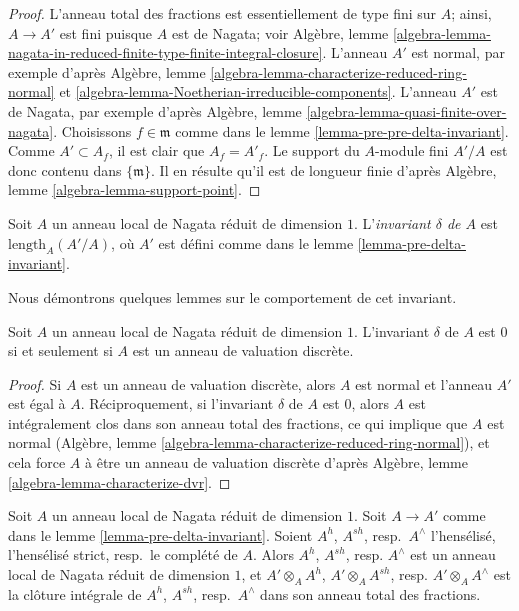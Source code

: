 \begin{proof}
L'anneau total des fractions est essentiellement de type fini sur $A$;
ainsi, $A \to A'$ est fini puisque $A$ est de Nagata; voir Algèbre, lemme
\ref{algebra-lemma-nagata-in-reduced-finite-type-finite-integral-closure}.
L'anneau $A'$ est normal, par exemple d'après
Algèbre, lemme \ref{algebra-lemma-characterize-reduced-ring-normal} et
\ref{algebra-lemma-Noetherian-irreducible-components}.
L'anneau $A'$ est de Nagata, par exemple d'après
Algèbre, lemme \ref{algebra-lemma-quasi-finite-over-nagata}.
Choisissons $f \in \mathfrak m$ comme dans le lemme \ref{lemma-pre-pre-delta-invariant}.
Comme $A' \subset A_f$, il est clair que $A_f = A'_f$. Le support du
$A$-module fini $A'/A$ est donc contenu dans $\{\mathfrak m\}$.
Il en résulte qu'il est de longueur finie d'après
Algèbre, lemme \ref{algebra-lemma-support-point}.
\end{proof}

\begin{definition}
\label{definition-delta-invariant-algebra}
Soit $A$ un anneau local de Nagata réduit de dimension $1$.
L'{\it invariant $\delta$ de $A$} est $\text{length}_A(A'/A)$,
où $A'$ est défini comme dans le lemme \ref{lemma-pre-delta-invariant}.
\end{definition}

\noindent
Nous démontrons quelques lemmes sur le comportement de cet invariant.

\begin{lemma}
\label{lemma-delta-invariant-is-zero}
Soit $A$ un anneau local de Nagata réduit de dimension $1$.
L'invariant $\delta$ de $A$ est $0$ si et seulement si
$A$ est un anneau de valuation discrète.
\end{lemma}

\begin{proof}
Si $A$ est un anneau de valuation discrète, alors $A$ est normal et
l'anneau $A'$ est égal à $A$. Réciproquement, si
l'invariant $\delta$ de $A$ est $0$, alors $A$ est intégralement
clos dans son anneau total des fractions, ce qui implique que
$A$ est normal
(Algèbre, lemme \ref{algebra-lemma-characterize-reduced-ring-normal}),
et cela force $A$ à être un anneau de valuation discrète d'après
Algèbre, lemme \ref{algebra-lemma-characterize-dvr}.
\end{proof}

\begin{lemma}
\label{lemma-normalization-same-after-completion}
Soit $A$ un anneau local de Nagata réduit de dimension $1$.
Soit $A \to A'$ comme dans le lemme \ref{lemma-pre-delta-invariant}.
Soient $A^h$, $A^{sh}$, resp.\ $A^\wedge$
l'hensélisé, l'hensélisé strict, resp.\ le complété de $A$.
Alors $A^h$, $A^{sh}$, resp. $A^\wedge$ est un anneau local de Nagata
réduit de dimension $1$, et
$A' \otimes_A A^h$, $A' \otimes_A A^{sh}$, resp. $A' \otimes_A A^\wedge$
est la clôture intégrale de $A^h$, $A^{sh}$, resp.\ $A^\wedge$
dans son anneau total des fractions.
\end{lemma}

